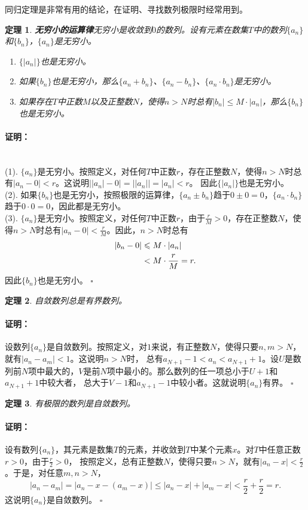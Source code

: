 \documentclass[12pt,UTF8]{ctexbook}
\newtheorem{tm}{定理}[section]
\renewenvironment{proof}{\paragraph{\textbf{证明：}}}{\hfill$\square$}
\begin{document}
\begin{appendix}
同归定理是非常有用的结论，在证明、寻找数列极限时经常用到。

\begin{tm}{\textbf{无穷小的运算律}}\label{tm:a-0-50}
    无穷小是收敛到$0$的数列。设有元素在数集$T$中的数列$\{a_n\}$和$\{b_n\}$，$\{a_n\}$是无穷小。
    \begin{enumerate}
        \item $\{|a_n|\}$也是无穷小。
        \item 如果$\{b_n\}$也是无穷小，那么$\{a_n + b_n\}$、$\{a_n - b_n\}$、$\{a_n\cdot b_n\}$是无穷小。
        \item 如果存在$T$中正数$M$以及正整数$N$，使得$n>N$时总有$|b_n| \leqslant M\cdot |a_n|$，那么$\{b_n\}$也是无穷小。
    \end{enumerate}
\end{tm}
\begin{proof}
    \mbox{} \\
    (1). $\{a_n\}$是无穷小。按照定义，对任何$T$中正数$r$，存在正整数$N$，使得$n>N$时总有$|a_n - 0| < r$。这说明$\big||a_n| - 0\big| = \big||a_n|\big| = |a_n| < r$。
    因此$\{|a_n|\}$也是无穷小。\\
    (2). 如果$\{b_n\}$也是无穷小，按照极限的运算律，$\{a_n \pm b_n\}$趋于$0 \pm 0 = 0$，$\{a_n \cdot b_n\}$趋于$0 \cdot 0 = 0$，因此都是无穷小。\\
    (3). $\{a_n\}$是无穷小。按照定义，对任何$T$中正数$r$，由于$\frac{r}{M} > 0$，存在正整数$N$，使得$n>N$时总有$|a_n - 0| < \frac{r}{M}$。因此，$n>N$时总有
    \begin{align}
        |b_n - 0| &\leqslant M\cdot |a_n| \notag \\ 
        &< M\cdot \frac{r}{M} = r.  \notag
    \end{align}
    因此$\{b_n\}$也是无穷小。
\end{proof}

\begin{tm}\label{tm:a-0-60}
    自敛数列总是有界数列。
\end{tm}
\begin{proof}
    设数列$\{a_n\}$是自敛数列。按照定义，对$1$来说，有正整数$N$，使得只要$n,m>N$，就有$|a_n - a_m| < 1$。这说明$n>N$时，
    总有$a_{N+1} - 1 < a_n < a_{N+1} + 1$。设$U$是数列前$N$项中最大的，$V$是前$N$项中最小的。那么数列的任一项总小于$U+1$和$a_{N+1}+1$中较大者，
    总大于$V-1$和$a_{N+1}-1$中较小者。这就说明$\{a_n\}$有界。
\end{proof}

\begin{tm}\label{tm:a-0-70}
    有极限的数列是自敛数列。
\end{tm}
\begin{proof}
    设有数列$\{a_n\}$，其元素是数集$T$的元素，并收敛到$T$中某个元素$x$。对$T$中任意正数$r>0$，由于$\frac{r}{2}>0$，
    按照定义，总有正整数$N$，使得只要$n>N$，就有$|a_n - x| < \frac{r}{2}$。于是，对任意$m,n>N$，
    $$ |a_n - a_m| = |a_n - x - (a_m - x)| \leqslant |a_n - x| + |a_m - x| < \frac{r}{2} + \frac{r}{2} = r.$$
    这说明$\{a_n\}$是自敛数列。
\end{proof}


\end{appendix}
\end{document}
